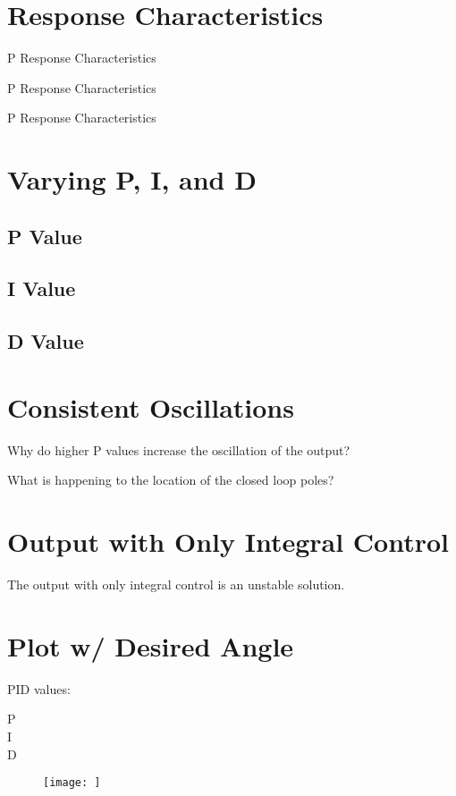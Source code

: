 \section{Response Characteristics}

\begin{table}[H]
	\centering
	\caption{P Response Characteristics}
	\label{tab:p-data}
\end{table} 

\begin{table}[H]
	\centering
	\caption{P Response Characteristics}
	\label{tab:p-data}
\end{table} 

\begin{table}[H]
	\centering
	\caption{P Response Characteristics}
	\label{tab:p-data}
\end{table}
\section{Varying P, I, and D}

\subsection{P Value}
\subsection{I Value}
\subsection{D Value}

\section{Consistent Oscillations}

Why do higher P values increase the oscillation of the output?

What is happening to the location of the closed loop poles?

\section{Output with Only Integral Control}

The output with only integral control is an unstable solution. 
\section{Plot w/ Desired Angle}
PID values: 
\begin{description}
	\item[P] 
	\item[I]	
	\item[D]
\end{description}

\begin{figure}[H]
	\centering
	\texttt{[image: ]}
	\caption{}
	\label{fig:}
\end{figure}
